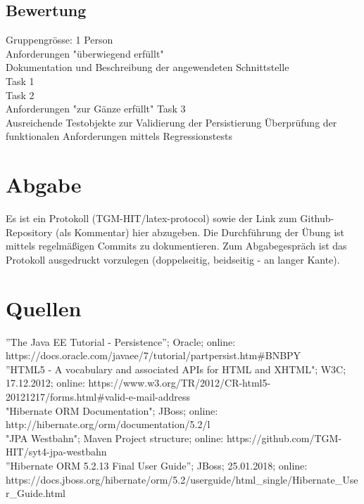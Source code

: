 \subsection{Bewertung} 

Gruppengrösse: 1 Person\\
Anforderungen "überwiegend erfüllt"\\
Dokumentation und Beschreibung der angewendeten Schnittstelle\\
Task 1\\
Task 2\\
Anforderungen "zur Gänze erfüllt"
Task 3\\
Ausreichende Testobjekte zur Validierung der Persistierung
Überprüfung der funktionalen Anforderungen mittels Regressionstests

\clearpage

\section{Abgabe} 
Es ist ein Protokoll (TGM-HIT/latex-protocol) sowie der Link zum Github-Repository (als Kommentar) hier abzugeben. Die Durchführung der Übung ist mittels regelmäßigen Commits zu dokumentieren. Zum Abgabegespräch ist das Protokoll ausgedruckt vorzulegen (doppelseitig, beidseitig - an langer Kante).

\section{Quellen} 

''The Java EE Tutorial - Persistence''; Oracle; online: https://docs.oracle.com/javaee/7/tutorial/partpersist.htm\#BNBPY\\
''HTML5 - A vocabulary and associated APIs for HTML and XHTML"; W3C; 17.12.2012; online: https://www.w3.org/TR/2012/CR-html5-20121217/forms.html\#valid-e-mail-address\\
"Hibernate ORM Documentation"; JBoss; online: http://hibernate.org/orm/documentation/5.2/l\\
"JPA Westbahn"; Maven Project structure; online: https://github.com/TGM-HIT/syt4-jpa-westbahn\\
''Hibernate ORM 5.2.13 Final User Guide''; JBoss; 25.01.2018; online:\\ https://docs.jboss.org/hibernate/orm/5.2/userguide/html\_single/Hibernate\_User\_Guide.html
